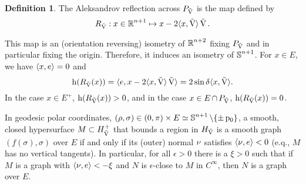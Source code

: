 \documentclass{amsart}
\theoremstyle{definition}
\newtheorem{definition}[theorem]{Definition}
\theoremstyle{remark}
\numberwithin{equation}{section}
\begin{document}
\begin{definition}
The Aleksandrov reflection across \(P_{\operatorname{\vec{V}}}\) is the map defined by
\[
R_{\operatorname{\vec{V}}}: x \in \operatorname{\mathbb{R}}^{n+1} \mapsto x - 2\langle{x},{\operatorname{\vec{V}}}\rangle \operatorname{\vec{V}}.
\]
\end{definition}

This map is an (orientation reversing) isometry of \(\operatorname{\mathbb{R}}^{n+2}\) fixing \(P_{\operatorname{\vec{V}}}\) and in particular fixing the origin. Therefore, it induces an isometry of \(\operatorname{\mathbb{S}}^{n+1}\). For \(x \in E\), we have \(\langle{x},{e}\rangle = 0\) and
\[
\operatorname{h}(R_{\operatorname{\vec{V}}}(x)) = \langle{e},{x - 2 \langle{x},{\operatorname{\vec{V}}}\rangle \operatorname{\vec{V}}}\rangle = 2 \sin\delta \langle{x},{\operatorname{\vec{V}}}\rangle.
\]
In the case \(x \in E^+\), \(\operatorname{h}(R_{\operatorname{\vec{V}}}(x)) > 0\), and in the case \(x \in E \operatorname{\cap} P_{\operatorname{\vec{V}}}\), \(\operatorname{h}(R_{\operatorname{\vec{V}}}(x)) = 0\).

In geodesic polar coordinates, \((\operatorname{\rho}, \sigma) \in (0, \pi) \times E \simeq \operatorname{\mathbb{S}}^{n+1}\backslash \{\pm \operatorname{p_0}\}\), a smooth, closed hypersurface \(M \subset {H}_{{\operatorname{\vec{V}}}}^+\) that bounds a region in \({H}_{{\operatorname{\vec{V}}}}\) is a smooth graph \((f(\sigma), \sigma)\) over \(E\) if and only if its (outer) normal \(\operatorname{\nu}\) satisfies \(\langle{\operatorname{\nu}},{e}\rangle < 0\) (e.q., \(M\) has no vertical tangents). In particular, for all \(\epsilon>0\) there is a \(\xi>0\) such that if \(M\) is a graph with \(\langle{\operatorname{\nu}},{e}\rangle < -\xi\) and \(N\) is \(\epsilon\)-close to \(M\) in \(C^{\infty}\), then \(N\) is a graph over \(E\).
\end{document}
